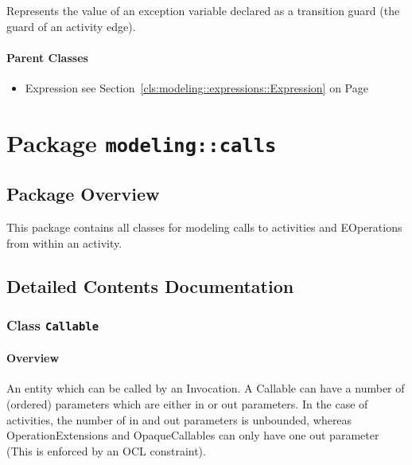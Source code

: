 	
			
Represents the value of an exception variable declared as a transition guard (the guard of an activity edge).	
		
	



\paragraph{Parent Classes}
\begin{itemize}
\item Expression see Section~\ref{cls:modeling::expressions::Expression} on Page~\pageref{cls:modeling::expressions::Expression}\end{itemize}
\newpage
		


\section{Package \bfseries \texttt{modeling::calls}\normalfont}
\subsection{Package Overview}
	
			
This package contains all classes for modeling calls to activities and EOperations
from within an activity.	
		
	
			
		



\subsection{Detailed Contents Documentation}
\subsubsection{\Large{Class \bfseries \texttt{Callable}\normalfont}}
\label{cls:modeling::calls::Callable} 
\paragraph{Overview}

	
			
An entity which can be called by an Invocation. A Callable can have a number of (ordered) parameters which are either in or out parameters. In the case of activities, the number of in and out parameters is unbounded, whereas OperationExtensions and OpaqueCallables can only have one out parameter (This is enforced by an OCL constraint).	
		
